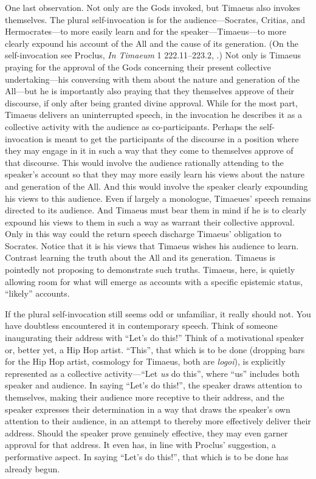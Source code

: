 One last observation. Not only are the Gods invoked, but Timaeus also invokes themselves. The plural self-invocation is for the audience---Socrates, Critias, and Herm\-ocrates---to more easily learn and for the speaker---Timaeus---to more clearly expound his account of the All and the cause of its generation. (On the self-invocation see Proclus, \emph{In Timaeum} 1 222.11--223.2, \citealt{Diehl:1903re}.) Not only is Timaeus praying for the approval of the Gods concerning their present collective undertaking---his conversing with them about the nature and generation of the All---but he is importantly also praying that they themselves approve of their discourse, if only after being granted divine approval. While for the most part, Timaeus delivers an uninterrupted speech, in the invocation he describes it as a collective activity with the audience as co-participants. Perhaps the self-invocation is meant to get the participants of the discourse in a position where they may engage in it in such a way that they come to themselves approve of that discourse. This would involve the audience rationally attending to the speaker's account so that they may more easily learn his views about the nature and generation of the All. And this would involve the speaker clearly expounding his views to this audience. Even if largely a monologue, Timaeues' speech remains directed to its audience. And Timaeus must bear them in mind if he is to clearly expound his views to them in such a way as warrant their collective approval. Only in this way could the return speech discharge Timaeus' obligation to Socrates. Notice that it is his views that Timaeus wishes his audience to learn. Contrast learning the truth about the All and its generation. Timaeus is pointedly not proposing to demonstrate such truths. Timaeus, here, is quietly allowing room for what will emerge as accounts with a specific epistemic status, ``likely'' accounts.

If the plural self-invocation still seems odd or unfamiliar, it really should not. You have doubtless encountered it in contemporary speech. Think of someone inaugurating their address with ``Let's do this!'' Think of a motivational speaker or, better yet, a Hip Hop artist. ``This'', that which is to be done (dropping bars for the Hip Hop artist, cosmology for Timaeus, both are \emph{logoi}), is explicitly represented as a collective activity---``Let \emph{us} do this'', where ``us'' includes both speaker and audience. In saying ``Let's do this!'', the speaker draws attention to themselves, making their audience more receptive to their address, and the speaker expresses their determination in a way that draws the speaker's own attention to their audience, in an attempt to thereby more effectively deliver their address. Should the speaker prove genuinely effective, they may even garner approval for that address. It even has, in line with Proclus' suggestion, a performative aspect. In saying ``Let's do this!'', that which is to be done has already begun.

